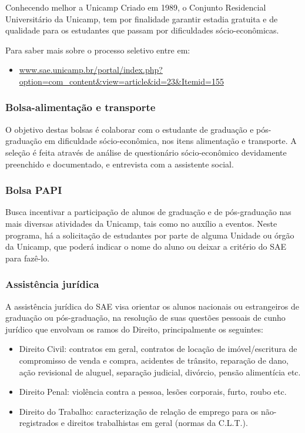 \begin{story}{Conhecendo melhor a Unicamp}
Criado em 1989, o Conjunto Residencial Universitário da Unicamp, tem por finalidade garantir estadia gratuita e de qualidade para os estudantes que passam por dificuldades sócio-econômicas.

Para saber mais sobre o processo seletivo entre em:

\begin{itemize}
\item \url{www.sae.unicamp.br/portal/index.php?option=com_content&view=article&id=23&Itemid=155}
\end{itemize}

\subsubsection*{Bolsa-alimentação e transporte}

O objetivo destas bolsas é colaborar com o estudante de graduação e pós-graduação em dificuldade sócio-econômica, nos itens alimentação e transporte. A seleção é feita através de análise de questionário sócio-econômico devidamente preenchido e documentado, e entrevista com a assistente social.

\subsubsection*{Bolsa PAPI}

Busca incentivar a participação de alunos de graduação e de pós-graduação nas mais diversas atividades da Unicamp, tais como no auxílio a eventos. Neste programa, há a solicitação de estudantes por parte de alguma Unidade ou órgão da Unicamp, que poderá indicar o nome do aluno ou deixar a critério do SAE para fazê-lo.

\subsubsection*{Assistência jurídica}

A assistência jurídica do SAE visa orientar os alunos nacionais ou estrangeiros de graduação ou pós-graduação, na resolução de suas questões pessoais de cunho jurídico que envolvam os ramos do Direito, principalmente os seguintes:

\begin{itemize}
\item Direito Civil: contratos em geral, contratos de locação de imóvel/escritura de compromisso de venda e compra, acidentes de trânsito, reparação de dano, ação revisional de aluguel, separação judicial, divórcio, pensão alimentícia etc.
\item Direito Penal: violência contra a pessoa, lesões corporais, furto, roubo etc.
\item Direito do Trabalho: caracterização de relação de emprego para os não-registrados e direitos trabalhistas em geral (normas da C.L.T.).
\end{itemize}


\end{story}

